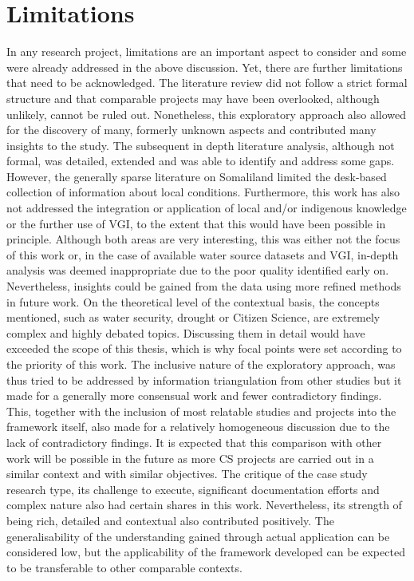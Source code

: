 \section{Limitations}
In any research project, limitations are an important aspect to consider and some were already addressed in the above discussion. Yet, there are further limitations that need to be acknowledged. The literature review did not follow a strict formal structure and that comparable projects may have been overlooked, although unlikely, cannot be ruled out. Nonetheless, this exploratory approach also allowed for the discovery of many, formerly unknown aspects and contributed many insights to the study. The subsequent in depth literature analysis, although not formal, was detailed, extended and was able to identify and address some gaps. However, the generally sparse literature on Somaliland limited the desk-based collection of information about local conditions. Furthermore, this work has also not addressed the integration or application of local and/or indigenous knowledge or the further use of VGI, to the extent that this would have been possible in principle. Although both areas are very interesting, this was either not the focus of this work or, in the case of available water source datasets and VGI, in-depth analysis was deemed inappropriate due to the poor quality identified early on. Nevertheless, insights could be gained from the data using more refined methods in future work. On the theoretical level of the contextual basis, the concepts mentioned, such as water security, drought or Citizen Science, are extremely complex and highly debated topics. Discussing them in detail would have exceeded the scope of this thesis, which is why focal points were set according to the priority of this work.\newline
The inclusive nature of the exploratory approach, was thus tried to be addressed by information triangulation from other studies but it made for a generally more consensual work and fewer contradictory findings. This, together with the inclusion of most relatable studies and projects into the framework itself, also made for a relatively homogeneous discussion due to the lack of contradictory findings. It is expected that this comparison with other work will be possible in the future as more CS projects are carried out in a similar context and with similar objectives.\newline
The critique of the case study research type, its challenge to execute, significant documentation efforts and complex nature also had certain shares in this work. Nevertheless, its strength of being rich, detailed and contextual also contributed positively. The generalisability of the understanding gained through actual application can be considered low, but the applicability of the framework developed can be expected to be transferable to other comparable contexts.\newline
